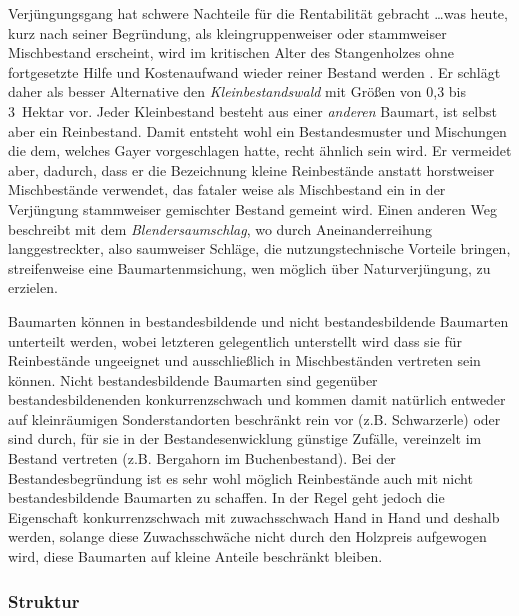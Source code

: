 \documentclass[twocolumn]{scrartcl}
\begin{document}
Verjüngungsgang hat schwere Nachteile für die Rentabilität gebracht
\dots was heute, kurz nach seiner Begründung, als kleingruppenweiser
oder stammweiser Mischbestand erscheint, wird im kritischen Alter des
Stangenholzes ohne fortgesetzte Hilfe und Kostenaufwand wieder reiner
Bestand werden\flqq{}
\citep[S.~547]{mayr1909WaldbauAufNaturgesetzlicherGrundlage}. Er
schlägt daher als besser Alternative den \emph{Kleinbestandswald} mit
Größen von 0,3 bis 3~Hektar vor. Jeder Kleinbestand besteht aus einer
\emph{anderen} Baumart, ist selbst aber ein Reinbestand. Damit
entsteht wohl ein Bestandesmuster und Mischungen die dem, welches
Gayer vorgeschlagen hatte, recht ähnlich sein wird. Er vermeidet aber,
dadurch, dass er die Bezeichnung kleine Reinbestände anstatt
horstweiser Mischbestände verwendet, das fataler weise als
Mischbestand ein in der Verjüngung stammweiser gemischter Bestand
gemeint wird. Einen anderen Weg beschreibt
\cite{wagner1923DerBlendersaumschlagUndSeinSystem} mit dem
\emph{Blendersaumschlag}, wo durch Aneinanderreihung langgestreckter,
also saumweiser Schläge, die nutzungstechnische Vorteile bringen,
streifenweise eine Baumartenmsichung, wen möglich über
Naturverjüngung, zu erzielen.

Baumarten können in bestandesbildende und nicht bestandesbildende
Baumarten unterteilt werden, wobei letzteren gelegentlich unterstellt
wird dass sie für Reinbestände ungeeignet und ausschließlich in
Mischbeständen vertreten sein können. Nicht bestandesbildende
Baumarten sind gegenüber bestandesbildenenden konkurrenzschwach und
kommen damit natürlich entweder auf kleinräumigen Sonderstandorten
beschränkt rein vor (z.B. Schwarzerle) oder sind durch, für sie in der
Bestandesenwicklung günstige Zufälle, vereinzelt im Bestand vertreten
(z.B. Bergahorn im Buchenbestand). Bei der Bestandesbegründung ist es
sehr wohl möglich Reinbestände auch mit nicht bestandesbildende
Baumarten zu schaffen. In der Regel geht jedoch die Eigenschaft
konkurrenzschwach mit zuwachsschwach Hand in Hand und deshalb werden,
solange diese Zuwachsschwäche nicht durch den Holzpreis aufgewogen
wird, diese Baumarten auf kleine Anteile beschränkt bleiben.

\subsubsection{Struktur}
\label{sssec:struktur}
\end{document}
